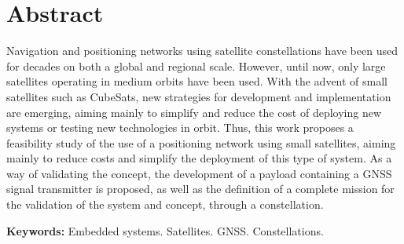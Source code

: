 %
%
%
%
%

%
%
%
%
%

\chapter*{Abstract}

{\parindent0pt
Navigation and positioning networks using satellite constellations have been used for decades on both a global and regional scale. However, until now, only large satellites operating in medium orbits have been used. With the advent of small satellites such as CubeSats, new strategies for development and implementation are emerging, aiming mainly to simplify and reduce the cost of deploying new systems or testing new technologies in orbit. Thus, this work proposes a feasibility study of the use of a positioning network using small satellites, aiming mainly to reduce costs and simplify the deployment of this type of system. As a way of validating the concept, the development of a payload containing a GNSS signal transmitter is proposed, as well as the definition of a complete mission for the validation of the system and concept, through a constellation.
}

\smallskip
\noindent \textbf{Keywords:} Embedded systems. Satellites. GNSS. Constellations.
